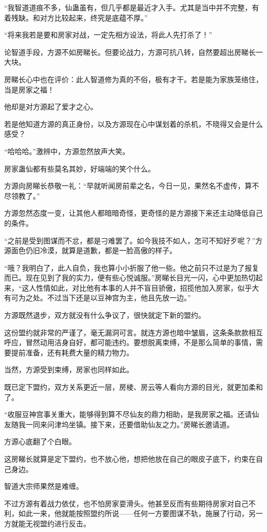 \begin{this_body}
“我智道道痕不多，仙蛊虽有，但几乎都是最近才入手。尤其是当中并不完整，有着残缺。和对方比较起来，终究是底蕴不厚。”

“将来我若是要和房家对战，一定先相方设法，将此人先打杀了！”

论智道手段，方源不如房睇长。但要论战力，方源可抗八转，自然要超出房睇长一大块。

房睇长心中也在评价：此人智道修为真的不俗，极有才干。若是能为家族笼络住，当是房家之福！

他却是对方源起了爱才之心。

若是他知道方源的真正身份，以及方源现在心中谋划着的杀机，不晓得又会是什么感受？

“哈哈哈。”激辨中，方源忽然放声大笑。

房家蛊仙都有些莫名其妙，好端端的笑个什么。

方源向房睇长恭敬一礼：“早就听闻房前辈之名，今日一见，果然名不虚传，算不尽领教了。”

方源忽然态度一变，让其他人都暗暗奇怪，更奇怪的是方源接下来还主动降低自己的条件。

“之前是受到图谋而不忿，都是刁难罢了。如今我技不如人，怎可不知好歹呢？”方源面色仍旧冷漠，就算是道歉，都是一脸高傲的样子。

“哦？我明白了，此人自负，我也算小小折服了他一些。他之前只不过是为了报复而已。现在见到了我的实力，便有些心悦诚服。”房睇长目光一闪，心中更加热切起来，“这人性情如此，对比他有本事的人并不盲目骄傲，招揽他加入房家，似乎大有可为之处。不过当下还是以豆神宫为主，他且先放一边。”

方源既然退步，双方就没有什么争议了，很快就定下新的盟约。

这份盟约就非常的严谨了，毫无漏洞可言。就连方源也暗中皱眉，这条条款款相互呼应，冒然动用洁身自好，都可能违约。要想脱离束缚，不是那么简单的事情，需要提前准备，还有耗费大量的精力物力。

当然，方源受到束缚，房家也同样如此。

既已定下盟约，双方关系更近一层，房棱、房云等人看向方源的目光，就更加柔和了。

“收服豆神宫事关重大，能够得到算不尽仙友的鼎力相助，是我房家之福。还请仙友随我一同来问津坞坐镇。接下来，还要借助仙友之力。”房睇长邀请道。

方源心底翻了个白眼。

这房睇长就算是定下盟约，也不放心他，想把他放在自己的眼皮子底下，约束在自己身边。

智道大宗师果然是难缠。

不过方源有着战力依仗，也不怕房家耍滑头。他甚至反而有些期待房家对自己不利，如此一来，他就能按照盟约所说——任何一方要图谋不轨，施展了行动，另一方就能无视盟约进行反击。


\end{this_body}
